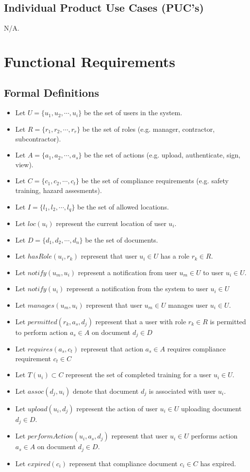 \documentclass[12pt]{article}
\begin{document}
\subsection{Individual Product Use Cases (PUC's)}
N/A.
\section{Functional Requirements}
\subsection{Formal Definitions}
\begin{itemize}
  \item Let \(U = \{u_1, u_2, \cdots, u_i\}\) be the set of users in the system.
  \item Let \(R = \{r_1, r_2, \cdots, r_r\}\) be the set of roles (e.g. manager,
    contractor, subcontractor).
  \item Let \(A = \{a_1, a_2, \cdots, a_s\}\) be the set of actions (e.g.
    upload, authenticate, sign, view).
  \item Let \(C = \{c_1, c_2, \cdots, c_t\}\) be the set of compliance
    requirements (e.g. safety training, hazard assesments).
  \item Let \(I = \{l_1, l_2, \cdots, l_q\}\) be the set of allowed locations.
  \item Let \(loc(u_i)\) represent the current location of user \(u_i\).
  \item Let \(D = \{d_1, d_2, \cdots, d_n\}\) be the set of documents.
  \item Let \(hasRole(u_i, r_k)\) represent that user \(u_i \in U\) has a role
    \(r_k \in R\).
  \item Let \(notify(u_m, u_i)\) represent a notification from user
    \(u_m \in U\) to user \(u_i \in U\).
  \item Let \(notify(u_i)\) represent a notification from the system to user
    \(u_i \in U\)
  \item Let \(manages(u_m, u_i)\) represent that user \(u_m \in U\)
    manages user \(u_i \in U\).
  \item Let \(permitted(r_k, a_s, d_j)\) represent that a user with
    role \(r_k \in R\) is permitted to perform action \(a_s \in A\)
    on document \(d_j \in D\)
  \item Let \(requires(a_s, c_t)\) represent that action \(a_s \in A\) requires
    compliance requirement \(c_t \in C\)
  \item Let \(T(u_i) \subset C\) represent the set of completed training for a
    user \(u_i \in U\).
  \item Let \(assoc(d_j, u_i)\) denote that document \(d_j\) is associated with
    user \(u_i\).
  \item Let \(upload(u_i, d_j)\) represent the action of user \(u_i \in U\)
    uploading document \(d_j \in D\).
  \item Let \(performAction(u_i, a_s, d_j)\) represent that user \(u_i \in U\)
    performs action \(a_s \in A\) on document \(d_j \in D\).
  \item Let \(expired(c_i)\) represent that compliance document \(c_i \in C\)
    has expired.
\end{itemize}
\end{document}
